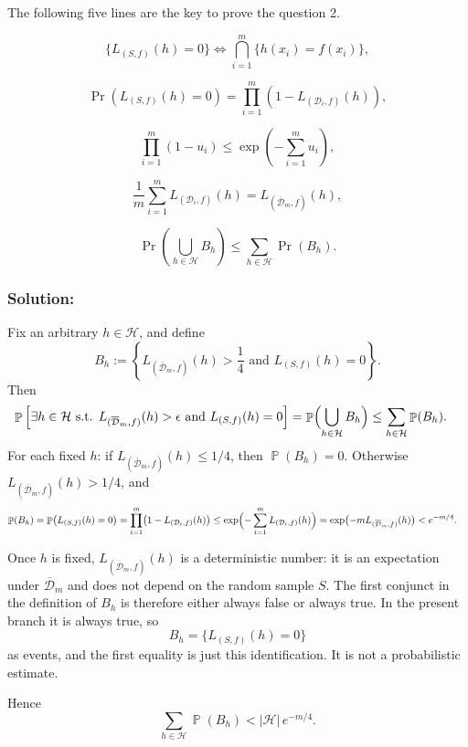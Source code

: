 \documentclass[11pt,a4paper]{article}
\DeclareMathOperator{\Pbb}{\mathbb{P}}
\theoremstyle{definition}
\begin{document}
The following five lines are the key to prove the question 2.

\[
\{L_{(S,f)}(h) = 0 \} \iff \bigcap_{i=1}^{m} \{h(x_i) = f(x_i)\},
\]

\[
\Pr(L_{(S,f)}(h) = 0) = \prod_{i=1}^{m} (1 - L_{(\mathcal{D}_i,f)}(h)),
\]

\[
\prod_{i=1}^{m} (1 - u_i) \leq \exp\left( -\sum_{i=1}^{m} u_i \right),
\]

\[
\frac{1}{m} \sum_{i=1}^{m} L_{(\mathcal{D}_i,f)}(h) = L_{(\overline{\mathcal{D}}_m,f)}(h),
\]

\[
\Pr\left( \bigcup_{h \in \mathcal{H}} B_h \right) \leq \sum_{h \in \mathcal{H}} \Pr(B_h).
\]

\subsubsection{Solution:}

Fix an arbitrary $h \in \mathcal{H}$, and define
\[
B_h := \left\{ L_{(\overline{\mathcal{D}}_m, f)}(h) > \frac{1}{4} \text{ and } L_{(S, f)}(h) = 0 \right\}.
\]
Then
\begin{align*}
\Pbb \left[ \exists h \in \mathcal{H} \text{ s.t. } L_{(\overline{\mathcal{D}}_m, f)}(h) > \epsilon \text{ and } L_{(S, f)}(h) = 0 \right]
&= \Pbb\Bigl(\bigcup_{h \in \mathcal{H}} B_h\Bigr)
\leq \sum_{h \in \mathcal{H}} \Pbb(B_h).
\end{align*}
For each fixed $h$: if $L_{(\overline{\mathcal{D}}_m, f)}(h) \le 1/4$, then $\Pbb(B_h)=0$. Otherwise $L_{(\overline{\mathcal{D}}_m, f)}(h) > 1/4$, and
\begin{align*}
\Pbb(B_h)
&= \Pbb\bigl(L_{(S,f)}(h)=0\bigr)
= \prod_{i=1}^{m}\bigl(1-L_{(\mathcal{D}_i,f)}(h)\bigr)
\leq \exp\Bigl(-\sum_{i=1}^{m} L_{(\mathcal{D}_i,f)}(h)\Bigr)
= \exp\bigl(-m L_{(\overline{\mathcal{D}}_m, f)}(h)\bigr)
    < e^{-m/4}.
\end{align*}
\begin{remark}
Once $h$ is fixed, $L_{(\overline{\mathcal{D}}_m, f)}(h)$ is a deterministic number: it is an expectation under $\overline{\mathcal{D}}_m$ and does not depend on the random sample $S$. The first conjunct in the definition of $B_h$ is therefore either always false or always true. In the present branch it is always true, so
\[
B_h = \bigl\{ L_{(S,f)}(h)=0 \bigr\}
\]
as events, and the first equality is just this identification. It is not a probabilistic estimate.
\end{remark}
Hence
\[
\sum_{h \in \mathcal{H}} \Pbb(B_h) < |\mathcal{H}|\, e^{-m/4}.
\]
\end{document}
